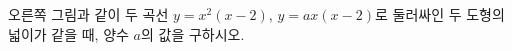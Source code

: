\noindent\begin{minipage}[t]{0.58\linewidth}\vspace{0pt}\raggedright 오른쪽 그림과 같이 두 곡선 $y=x^2(x-2)$, $y=ax(x-2)$로 둘러싸인 두 도형의 넓이가 같을 때, 양수 $a$의 값을 구하시오.\end{minipage}\hfill\begin{minipage}[t]{0.4\linewidth}\vspace{0pt}\centering \resizebox{\ifdim\width>\linewidth\linewidth\else\width\fi}{!}{}\end{minipage}\par
